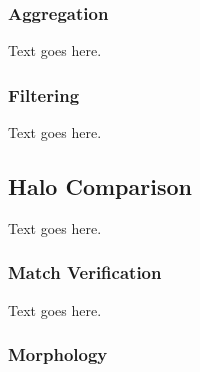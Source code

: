 \subsubsection{Aggregation}
\label{subsubsec:analysis--catalog--aggregation}


Text goes here.



\subsubsection{Filtering}
\label{subsubsec:analysis--catalog--filtering}


Text goes here.




\subsection{Halo Comparison}
\label{subsec:analysis--halo_comparison}


Text goes here.



\subsubsection{Match Verification}
\label{subsubsec:analysis--halo_comparison--match_verification}


Text goes here.



\subsubsection{Morphology}
\label{subsubsec:analysis--halo_comparison--morphology}


